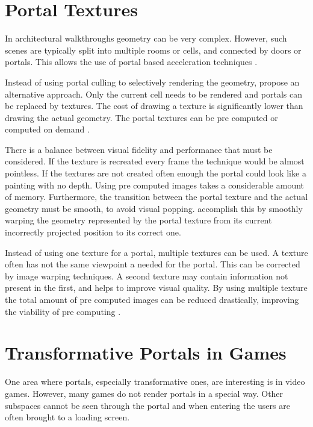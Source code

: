 \section{Portal Textures}
In architectural walkthroughs geometry can be very complex. However, such scenes are typically split into multiple rooms or cells, and connected by doors or portals. This allows the use of portal based acceleration techniques \cite{aliaga:1997:architectural}.

Instead of using portal culling to selectively rendering the geometry, \textcite{aliaga:1997:architectural} propose an alternative approach. Only the current cell needs to be rendered and portals can be replaced by textures. The cost of drawing a texture is significantly lower than drawing the actual geometry. The portal textures can be pre computed or computed on demand \cite{aliaga:1997:architectural}. 

There is a balance between visual fidelity and performance that must be considered. If the texture is recreated every frame the technique would be almost pointless. If the textures are not created often enough the portal could look like a painting with no depth. Using pre computed images takes a considerable amount of memory. Furthermore, the transition between the portal texture and the actual geometry must be smooth, to avoid visual popping. \textcite{aliaga:1997:architectural} accomplish this by smoothly warping the geometry represented by the portal texture from its current incorrectly projected position to its correct one.

Instead of using one texture for a portal, multiple textures can be used. A texture often has not the same viewpoint a needed for the portal. This can be corrected by image warping techniques. A second texture may contain information not present in the first, and helps to improve visual quality. By using multiple texture the total amount of pre computed images can be reduced drastically, improving the viability of pre computing \cite{rafferty:1998:3d}.

\section{Transformative Portals in Games}
One area where portals, especially transformative ones, are interesting is in video games. However, many games do not render portals in a special way. Other subspaces cannot be seen through the portal and when entering the users are often brought to a loading screen. 

